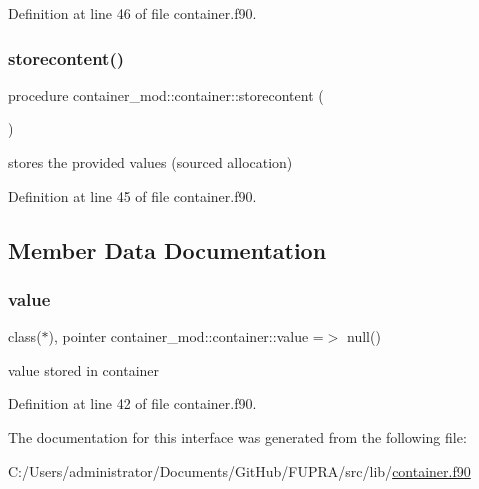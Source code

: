 Definition at line 46 of file container.\+f90.

\mbox{\label{structcontainer__mod_1_1container_a15e46e6f457bb49604ccf191780f6638}} 
\subsubsection{\texorpdfstring{storecontent()}{storecontent()}}
{\footnotesize\ttfamily procedure container\+\_\+mod\+::container\+::storecontent (\begin{DoxyParamCaption}{ }\end{DoxyParamCaption})\hspace{0.3cm}{\ttfamily [private]}}



stores the provided values (sourced allocation) 



Definition at line 45 of file container.\+f90.



\subsection{Member Data Documentation}
\mbox{\label{structcontainer__mod_1_1container_a297f4632156bf226aa8599a7f0cd55c0}} 
\subsubsection{\texorpdfstring{value}{value}}
{\footnotesize\ttfamily class($\ast$), pointer container\+\_\+mod\+::container\+::value =$>$ null()\hspace{0.3cm}{\ttfamily [private]}}



value stored in container 



Definition at line 42 of file container.\+f90.



The documentation for this interface was generated from the following file\+:\begin{DoxyCompactItemize}
\item 
C\+:/\+Users/administrator/\+Documents/\+Git\+Hub/\+F\+U\+P\+R\+A/src/lib/\hyperlink{container_8f90}{container.\+f90}\end{DoxyCompactItemize}
